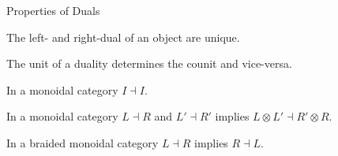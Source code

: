 \documentclass{beamer}
\begin{document}
\begin{frame}[t]{Properties of Duals}

  \begin{lemma}
    The left- and right-dual of an object are unique.
  \end{lemma}

  \pause

  \begin{lemma}
    The unit of a duality determines the counit and vice-versa.
  \end{lemma}

  \pause

  \begin{lemma}
    In a monoidal category $I \dashv I$.
  \end{lemma}

  \pause

  \begin{lemma}
    In a monoidal category $L \dashv R$ and $L' \dashv R'$ implies $L \otimes L' \dashv R' \otimes R$.
  \end{lemma}

  \pause

  \begin{lemma}
    In a braided monoidal category $L \dashv R$ implies $R \dashv L$.
  \end{lemma}

\end{frame}
\end{document}

